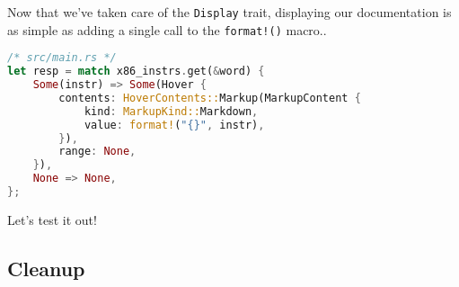 Now that we've taken care of the \texttt{Display} trait, displaying our documentation is as simple as adding a single call to the \texttt{format!()} macro..

\begin{lstlisting}[language=rust]
/* src/main.rs */
let resp = match x86_instrs.get(&word) {
    Some(instr) => Some(Hover {
        contents: HoverContents::Markup(MarkupContent {
            kind: MarkupKind::Markdown,
            value: format!("{}", instr),
        }),
        range: None,
    }),
    None => None,
};
\end{lstlisting}

Let's test it out!



\subsection{Cleanup}

